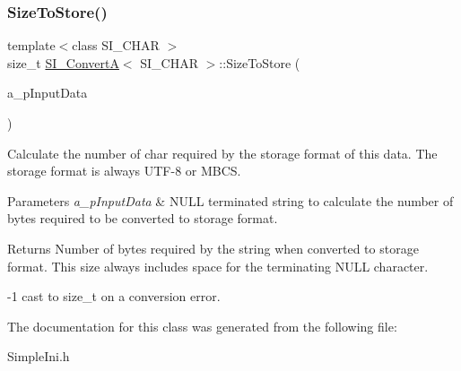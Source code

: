 \subsubsection{\texorpdfstring{Size\+To\+Store()}{SizeToStore()}}
{\footnotesize\ttfamily template$<$class S\+I\+\_\+\+C\+H\+AR $>$ \\
size\+\_\+t \hyperlink{a01888}{S\+I\+\_\+\+ConvertA}$<$ S\+I\+\_\+\+C\+H\+AR $>$\+::Size\+To\+Store (\begin{DoxyParamCaption}\item[{const S\+I\+\_\+\+C\+H\+AR $\ast$}]{a\+\_\+p\+Input\+Data }\end{DoxyParamCaption})\hspace{0.3cm}{\ttfamily [inline]}}

Calculate the number of char required by the storage format of this data. The storage format is always U\+T\+F-\/8 or M\+B\+CS.


\begin{DoxyParams}{Parameters}
{\em a\+\_\+p\+Input\+Data} & N\+U\+LL terminated string to calculate the number of bytes required to be converted to storage format. \\
\hline
\end{DoxyParams}
\begin{DoxyReturn}{Returns}
Number of bytes required by the string when converted to storage format. This size always includes space for the terminating N\+U\+LL character. 

-\/1 cast to size\+\_\+t on a conversion error. 
\end{DoxyReturn}


The documentation for this class was generated from the following file\+:\begin{DoxyCompactItemize}
\item 
Simple\+Ini.\+h\end{DoxyCompactItemize}

